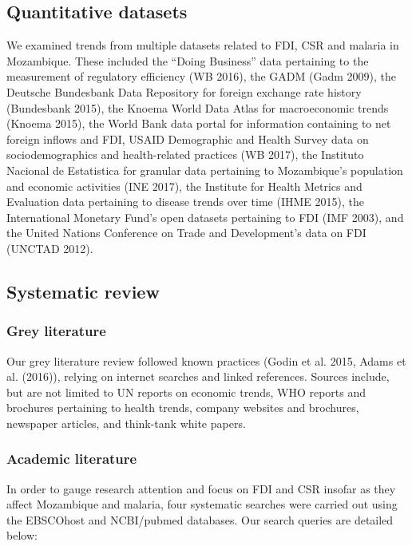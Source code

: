 \documentclass[]{article}
\begin{document}
\subsection{Quantitative datasets}\label{quantitative-datasets}

We examined trends from multiple datasets related to FDI, CSR and
malaria in Mozambique. These included the ``Doing Business'' data
pertaining to the measurement of regulatory efficiency (WB 2016), the
GADM (Gadm 2009), the Deutsche Bundesbank Data Repository for foreign
exchange rate history (Bundesbank 2015), the Knoema World Data Atlas for
macroeconomic trends (Knoema 2015), the World Bank data portal for
information containing to net foreign inflows and FDI, USAID Demographic
and Health Survey data on sociodemographics and health-related practices
(WB 2017), the Instituto Nacional de Estatistica for granular data
pertaining to Mozambique's population and economic activities (INE
2017), the Institute for Health Metrics and Evaluation data pertaining
to disease trends over time (IHME 2015), the International Monetary
Fund's open datasets pertaining to FDI (IMF 2003), and the United
Nations Conference on Trade and Development's data on FDI (UNCTAD 2012).

\subsection{Systematic review}\label{systematic-review}

\subsubsection{Grey literature}\label{grey-literature}

Our grey literature review followed known practices (Godin et al. 2015,
Adams et al. (2016)), relying on internet searches and linked
references. Sources include, but are not limited to UN reports on
economic trends, WHO reports and brochures pertaining to health trends,
company websites and brochures, newspaper articles, and think-tank white
papers.

\subsubsection{Academic literature}\label{academic-literature}

In order to gauge research attention and focus on FDI and CSR insofar as
they affect Mozambique and malaria, four systematic searches were
carried out using the EBSCOhost and NCBI/pubmed databases. Our search
queries are detailed below:
\end{document}
